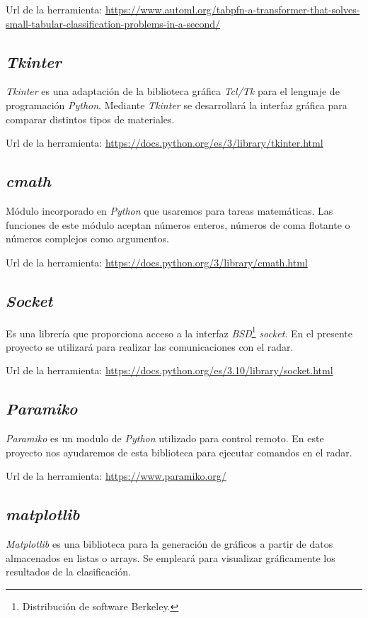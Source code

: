 Url de la herramienta: \url{https://www.automl.org/tabpfn-a-transformer-that-solves-small-tabular-classification-problems-in-a-second/}

\subsection{\textit{Tkinter}}

\textit{Tkinter} es una adaptación de la biblioteca gráfica \textit{Tcl/Tk} \cite{Tcl} para el lenguaje de programación \textit{Python}. Mediante \textit{Tkinter} se desarrollará la interfaz gráfica para comparar distintos tipos de materiales.

Url de la herramienta: \url{https://docs.python.org/es/3/library/tkinter.html}

\subsection{\textit{cmath}}
Módulo incorporado en \textit{Python} que usaremos para tareas matemáticas. Las funciones de este módulo aceptan números enteros, números de coma flotante o números complejos como argumentos.

Url de la herramienta: \url{https://docs.python.org/3/library/cmath.html}

\subsection{\textit{Socket}}
Es una librería que proporciona acceso a la interfaz \textit{BSD}\footnote{Distribución de software Berkeley.} \textit{socket}. En el presente proyecto se utilizará para realizar las comunicaciones con el radar.

Url de la herramienta: \url{https://docs.python.org/es/3.10/library/socket.html}

\subsection{\textit{Paramiko}}
\textit{Paramiko} es un modulo de \textit{Python} utilizado para control remoto. En este proyecto nos ayudaremos de esta biblioteca para ejecutar comandos en el radar.

Url de la herramienta: \url{https://www.paramiko.org/}

\subsection{\textit{matplotlib}}
\textit{Matplotlib} es una biblioteca para la generación de gráficos a partir de datos almacenados en listas o arrays. Se empleará para visualizar gráficamente los resultados de la clasificación.

